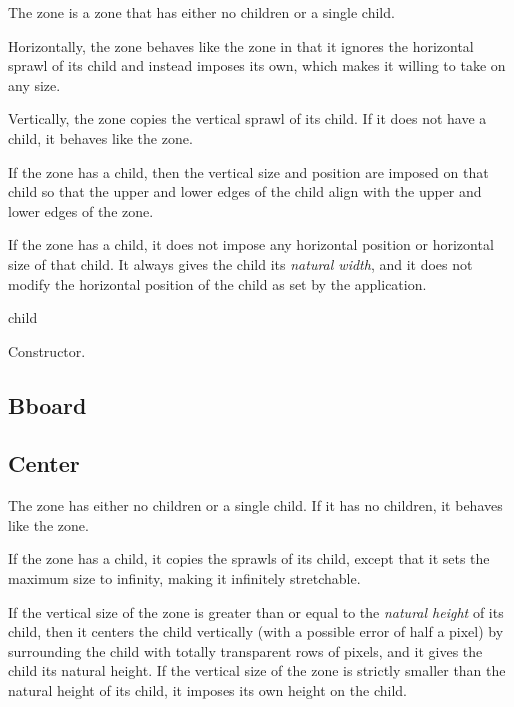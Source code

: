 
The  zone is a zone that has either no children or a single
child.  

Horizontally, the  zone behaves like the 
zone in that it ignores the horizontal sprawl of its child and instead
imposes its own, which makes it willing to take on any size.  

Vertically, the  zone copies the vertical sprawl of
its child.  If it does not have a child, it behaves like the
 zone.  

If the  zone has a child, then the vertical size and
position are imposed on that child so that the upper and lower edges of
the child align with the upper and lower edges of the 
zone.  

If the  zone has a child, it does not impose any horizontal
position or horizontal size of that child.  It always gives the child
its \emph{natural width}, and it does not modify the horizontal
position of the child as set by the application.


 {\optional child}

Constructor. 

\subsection{Bboard}



\subsection{Center}

The  zone has either no children or a single child.  If
it has no children, it behaves like the  zone.

If the  zone has a child, it copies the sprawls of its
child, except that it sets the maximum size to infinity, making it
infinitely stretchable.  

If the vertical size of the  zone is greater than or
equal to the \emph{natural height} of its child, then it centers the
child vertically (with a possible error of half a pixel) by
surrounding the child with totally transparent rows of pixels, and it
gives the child its natural height.  If the vertical size of
the  zone is strictly smaller than the natural height of
its child, it imposes its own height on the child.

